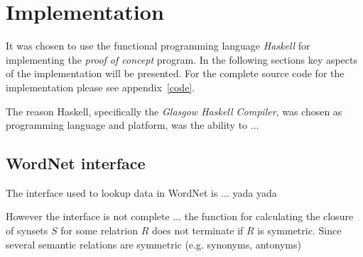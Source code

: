 
\chapter{Implementation}
\label{chap:Implementation}

It was chosen to use the functional programming language \emph{Haskell} for implementing the \emph{proof of concept} program. In the following sections key aspects of the implementation will be presented. For the complete source code for the implementation please see appendix~\ref{code}.

The reason Haskell, specifically the \emph{Glasgow Haskell Compiler}, was chosen as programming language and platform, was the ability to ... 
\clearpage



\section{WordNet interface}
The interface used to lookup data in WordNet is ... yada yada

However the interface is not complete ... the function for calculating the closure of synsets $S$ for some relatrion $R$ does not terminate if $R$ is symmetric. Since several semantic relations are symmetric (e.g. synonyms, antonyms)